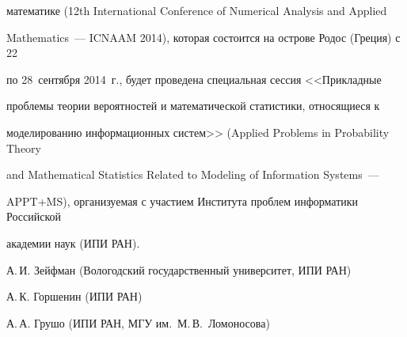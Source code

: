 математике (12th International Conference of Numerical Analysis and Applied 


Mathematics~--- ICNAAM 2014), которая состоится на острове Родос (Греция) с 22 


по 28~сентября 2014~г., будет проведена специальная сессия <<Прикладные 


проблемы теории вероятностей и математической статистики, относящиеся к 


моделированию информационных систем>> (Applied Problems in Probability Theory 


and Mathematical Statistics Related to Modeling of Information Systems~--- 


APPT\;+\;MS), организуемая с участием Института проблем информатики Российской 


академии наук (ИПИ РАН).











\vspace*{6pt}





{\centerline{}}





\vspace*{5pt}





А.\,И. Зейфман (Вологодский государственный университет, ИПИ РАН)





А.\,К. Горшенин (ИПИ РАН)








\vspace*{6pt}





{\centerline{}}





\vspace*{5pt}





А.\,А. Грушо (ИПИ РАН, МГУ им.\ М.\,В.~Ломоносова)





